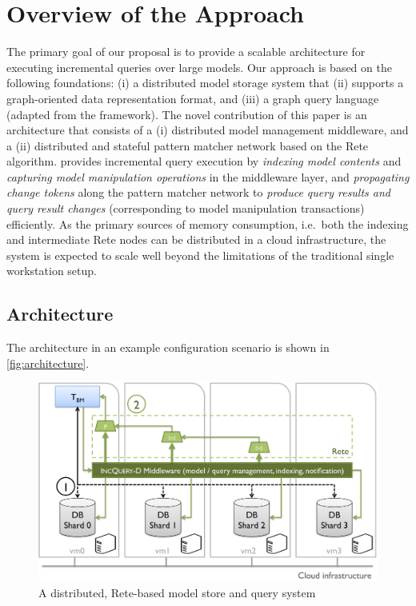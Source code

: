 \section{Overview of the Approach}
\label{sec:overview}

The primary goal of our proposal is to provide a scalable architecture for executing incremental queries over large models.  Our approach is based on the following foundations: (i) a distributed model storage system that (ii) supports a graph-oriented data representation format, and (iii) a graph query language (adapted from the \incquery{} framework). The novel contribution of this paper is an architecture that consists of a (i) distributed model management middleware, and a (ii) distributed and stateful pattern matcher network based on the Rete algorithm. \incqueryD{} provides incremental query execution by \emph{indexing model contents} and \emph{capturing model manipulation operations} in the middleware layer, and \emph{propagating change tokens} along the pattern matcher network to \emph{produce query results and query result changes} (corresponding to model manipulation transactions) efficiently. As the primary sources of memory consumption, i.e.\ both the indexing and intermediate Rete nodes can be distributed in a cloud infrastructure, the system is expected to scale well beyond the limitations of the traditional single workstation setup.

\subsection{Architecture}
\label{architecture}
The \incqueryD{} architecture in an example configuration scenario is shown in \autoref{fig:architecture}.

\begin{figure}[!t]
\begin{center}
\includegraphics[width=.95\columnwidth]{figures/architecture}
\caption{A distributed, Rete-based model store and query system}
\label{fig:architecture}
\end{center}
\end{figure}


